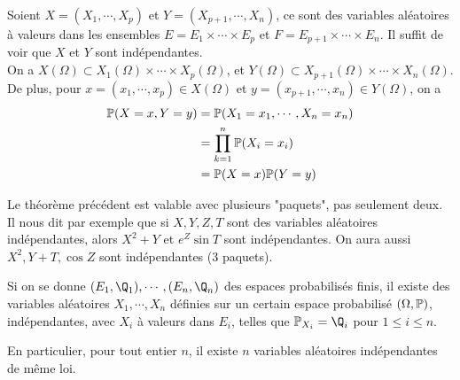 \documentclass[12pt,a4paper]{report}
\begin{document}
\begin{demo}{}
Soient $X = (X_1,\cdots,X_p)$ et $Y = (X_{p+1},\cdots,X_n)$, ce sont des variables aléatoires à valeurs dans les ensembles $E=E_1\times \cdots \times E_p$ et $F = E_{p+1} \times \cdots \times E_n$. Il suffit de voir que $X$ et $Y$ sont indépendantes. \\

On a $X(\Omega) \subset X_1(\Omega) \times \cdots \times X_p(\Omega)$, et $Y(\Omega) \subset X_{p+1}(\Omega) \times \cdots \times X_n(\Omega)$. \\

De plus, pour $x=(x_1,\cdots,x_p) \in X(\Omega)$ et $y=(x_{p+1},\cdots,x_n) \in Y(\Omega)$,  on a 
\begin{align*}
\mathbb{P}(X=x,Y=y) &= \mathbb{P}(X_1=x_1,\cdots,X_n=x_n) \\
&= \prod_{k=1}^n \mathbb{P}(X_i=x_i) \\
&= \mathbb{P}(X=x)\mathbb{P}(Y=y)
\end{align*}
\end{demo}

\begin{remarque}{}
Le théorème précédent est valable avec plusieurs "paquets", pas seulement deux. Il nous dit par exemple que si $X,Y,Z,T$ sont des variables aléatoires indépendantes, alors $X^2+Y$ et $e^Z\sin T$ sont indépendantes. On aura aussi $X^2,Y+T,\cos Z$ sont indépendantes (3 paquets).
\end{remarque}

\begin{proposition}{}{}
Si on se donne $(E_1,\Q_1), \cdots, (E_n,\Q_n)$ des espaces probabilisés finis, il existe des variables aléatoires $X_1,\cdots,X_n$ définies sur un certain espace probabilisé $(\Omega,\mathbb{P})$, indépendantes, avec $X_i$ à valeurs dans $E_i$, telles que $\p_{X_i} = \Q_i$ pour $1 \le i \le n$.
\end{proposition}{}

En particulier, pour tout entier $n$, il existe $n$ variables aléatoires indépendantes de même loi.
\end{document}
